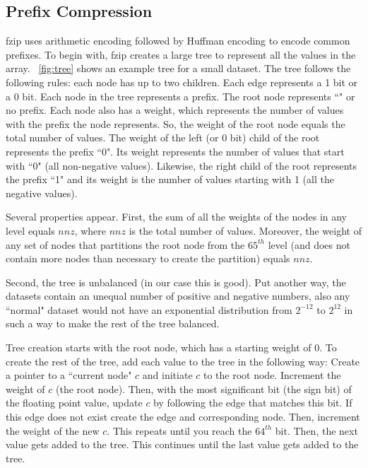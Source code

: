 \subsection{Prefix Compression}
fzip uses arithmetic encoding followed by Huffman encoding to encode common prefixes. To begin with, fzip creates a large tree to represent all the values in the array. \figurename~\ref{fig:tree} shows an example tree for a small dataset. The tree follows the following rules: each node has up to two children. Each edge represents a 1 bit or a 0 bit. Each node in the tree represents a prefix. The root node represents ``" or no prefix. Each node also has a weight, which represents the number of values with the prefix the node represents. So, the weight of the root node equals the total number of values. The weight of the left (or 0 bit) child of the root represents the prefix ``0". Its weight represents the number of  values that start with ``0" (all non-negative values). Likewise, the right child of the root represents the prefix ``1" and its weight is the number of values starting with 1 (all the negative values).\par
Several properties appear. First, the sum of all the weights of the nodes in any level equals $nnz$, where $nnz$ is the total number of values. Moreover, the weight of any set of nodes that partitions the root node from the $65^{th}$ level (and does not contain more nodes than necessary to create the partition) equals $nnz$.\par
Second, the tree is unbalanced (in our case this is good). Put another way, the datasets contain an unequal number of positive and negative numbers, also any ``normal" dataset would not have an exponential distribution from $2^{-12}$ to $2^{12}$ in such a way to make the rest of the tree balanced.\par
Tree creation starts with the root node, which has a starting weight of 0. To create the rest of the tree, add each value to the tree in the following way: Create a pointer to a ``current node" $c$ and initiate $c$ to the root node. Increment the weight of $c$ (the root node). Then, with the most significant bit (the sign bit) of the floating point value, update $c$ by following the edge that matches this bit. If this edge does not exist create the edge and corresponding node. Then, increment the weight of the new $c$. This repeats until you reach the $64^{th}$ bit. Then, the next value gets added to the tree. This continues until the last value gets added to the tree.\par
